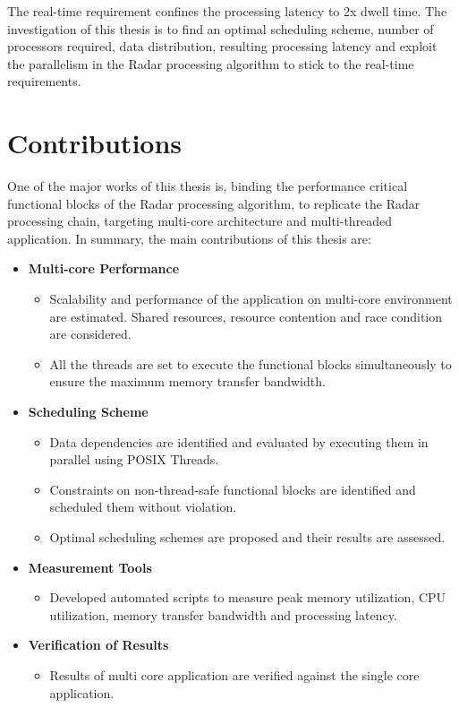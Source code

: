 The real-time requirement confines the processing latency to 2x dwell time. The investigation of this thesis is to find an optimal scheduling scheme, number of processors required, data distribution, resulting processing latency and exploit the parallelism in the Radar processing algorithm to stick to the real-time requirements.

\section{Contributions}
\label{sec:intro:contrib}
One of the major works of this thesis is, binding the performance critical functional blocks of the Radar processing algorithm, to replicate the Radar processing chain, targeting multi-core architecture and multi-threaded application. In summary, the main contributions of this thesis are:

\pagebreak
\begin{itemize}
\item{\bf Multi-core Performance}
  \begin{itemize}
    \item Scalability and performance of the application on multi-core environment are estimated. Shared resources, resource contention and race condition are considered.
    \item All the threads are set to execute the functional blocks simultaneously to ensure the maximum memory transfer bandwidth.
  \end{itemize}
\item {\bf Scheduling Scheme}
 	\begin{itemize}
 	\item Data dependencies are identified and evaluated by executing them in parallel using POSIX Threads.
   	\item Constraints on non-thread-safe functional blocks are identified and scheduled them without violation.
   	\item Optimal scheduling schemes are proposed and their results are assessed.
	\end{itemize}
\item {\bf Measurement Tools}
  \begin{itemize}
      \item Developed automated scripts to measure peak memory utilization, CPU utilization, memory transfer bandwidth and processing latency.
  \end{itemize}
 \item {\bf Verification of Results}
   \begin{itemize}
       \item Results of multi core application are verified against the single core application.
   \end{itemize}
\end{itemize}


